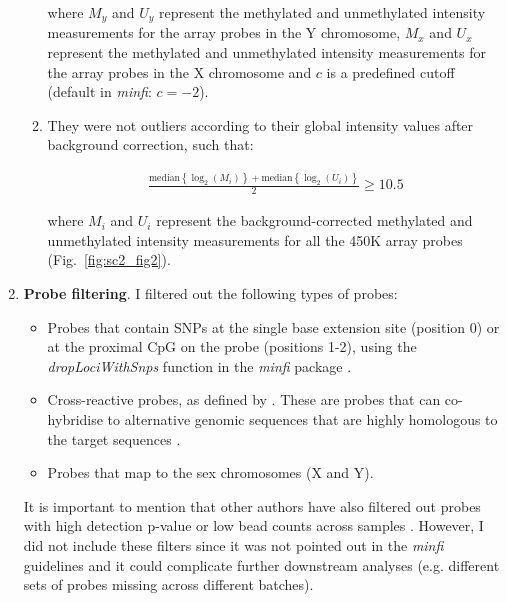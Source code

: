 \begin{enumerate}
\begin{enumerate}
			where $M_{y}$ and $U_{y}$ represent the methylated and unmethylated intensity measurements for the array probes in the Y chromosome, $M_{x}$ and $U_{x}$ represent the methylated and unmethylated intensity measurements for the array probes in the X chromosome and $c$ is a predefined cutoff (default in \textit{minfi}: $c=-2$).
			
			\smallskip
			
			\item They were not outliers according to their global intensity values after background correction, such that:
			
			\begin{align}
			\frac{\mathrm{median}\left\{\log_2(M_{i})\right\} + \mathrm{median}\left\{\log_2(U_{i})\right\}}{2} \geq 10.5
			\end{align}
			
			where $M_{i}$ and $U_{i}$ represent the background-corrected methylated and unmethylated intensity measurements for all the 450K array probes (Fig.~\ref{fig:sc2_fig2}).
			
		\end{enumerate} 
	
	\item \textbf{Probe filtering}. I filtered out the following types of probes:
	
	\begin{itemize}
		
		\item Probes that contain \acrshort{SNP}s at the single base extension site (position 0) or at the proximal CpG on the probe (positions 1-2), using the \textit{dropLociWithSnps} function in the \textit{minfi} package \citep{Aryee2014}. 
		
		\item Cross-reactive probes, as defined by \citet{Chen2013}. These are probes that can co-hybridise to alternative genomic sequences that are highly homologous to the target sequences \citep{Chen2013}.  
		
		\item  Probes that map to the sex chromosomes (X and Y).
	
	\end{itemize}
	
	It is important to mention that other authors have also filtered out probes with high detection p-value or low bead counts across samples \citep{Wilhelm-Benartzi2013,Morris2015}. However, I did not include these filters since it was not pointed out in the \textit{minfi} guidelines \citep{Aryee2014,Fortin2015} and it could complicate further downstream analyses (e.g. different sets of probes missing across different batches).     
	

\end{enumerate}
